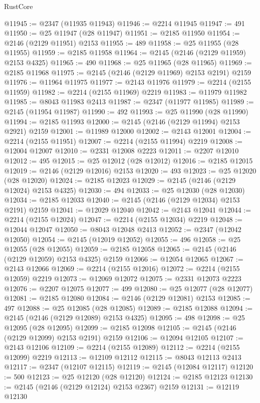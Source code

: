 \begin{lexlean}{RustCore}
\begin{coremodule}
@11945 := @2347 (@11935 @11943)
@11946 := @2214 @11945
@11947 := 491
@11950 := @25 @11947 (@28 @11947)
@11951 := @2185 @11950
@11954 := @2146 (@2129 @11951) @2153
@11955 := 489
@11958 := @25 @11955 (@28 @11955)
@11959 := @2185 @11958
@11964 := @2145 (@2146 (@2129 @11959) @2153 @4325)
@11965 := 490
@11968 := @25 @11965 (@28 @11965)
@11969 := @2185 @11968
@11975 := @2145 (@2146 (@2129 @11969) @2153 @2191) @2159
@11976 := @11964 @11975
@11977 := @2143 @11976
@11979 := @2214 (@2155 @11959)
@11982 := @2214 (@2155 @11969) @2219
@11983 := @11979 @11982
@11985 := @8043 @11983 @2413
@11987 := @2347 (@11977 @11985)
@11989 := @2145 (@11954 @11987)
@11990 := 492
@11993 := @25 @11990 (@28 @11990)
@11994 := @2185 @11993
@12000 := @2145 (@2146 (@2129 @11994) @2153 @2921) @2159
@12001 := @11989 @12000
@12002 := @2143 @12001
@12004 := @2214 (@2155 @11951)
@12007 := @2214 (@2155 @11994) @2219
@12008 := @12004 @12007
@12010 := @2331 @12008 @2223
@12011 := @2207 @12010
@12012 := 495
@12015 := @25 @12012 (@28 @12012)
@12016 := @2185 @12015
@12019 := @2146 (@2129 @12016) @2153
@12020 := 493
@12023 := @25 @12020 (@28 @12020)
@12024 := @2185 @12023
@12029 := @2145 (@2146 (@2129 @12024) @2153 @4325)
@12030 := 494
@12033 := @25 @12030 (@28 @12030)
@12034 := @2185 @12033
@12040 := @2145 (@2146 (@2129 @12034) @2153 @2191) @2159
@12041 := @12029 @12040
@12042 := @2143 @12041
@12044 := @2214 (@2155 @12024)
@12047 := @2214 (@2155 @12034) @2219
@12048 := @12044 @12047
@12050 := @8043 @12048 @2413
@12052 := @2347 (@12042 @12050)
@12054 := @2145 (@12019 @12052)
@12055 := 496
@12058 := @25 @12055 (@28 @12055)
@12059 := @2185 @12058
@12065 := @2145 (@2146 (@2129 @12059) @2153 @4325) @2159
@12066 := @12054 @12065
@12067 := @2143 @12066
@12069 := @2214 (@2155 @12016)
@12072 := @2214 (@2155 @12059) @2219
@12073 := @12069 @12072
@12075 := @2331 @12073 @2223
@12076 := @2207 @12075
@12077 := 499
@12080 := @25 @12077 (@28 @12077)
@12081 := @2185 @12080
@12084 := @2146 (@2129 @12081) @2153
@12085 := 497
@12088 := @25 @12085 (@28 @12085)
@12089 := @2185 @12088
@12094 := @2145 (@2146 (@2129 @12089) @2153 @4325)
@12095 := 498
@12098 := @25 @12095 (@28 @12095)
@12099 := @2185 @12098
@12105 := @2145 (@2146 (@2129 @12099) @2153 @2191) @2159
@12106 := @12094 @12105
@12107 := @2143 @12106
@12109 := @2214 (@2155 @12089)
@12112 := @2214 (@2155 @12099) @2219
@12113 := @12109 @12112
@12115 := @8043 @12113 @2413
@12117 := @2347 (@12107 @12115)
@12119 := @2145 (@12084 @12117)
@12120 := 500
@12123 := @25 @12120 (@28 @12120)
@12124 := @2185 @12123
@12130 := @2145 (@2146 (@2129 @12124) @2153 @2367) @2159
@12131 := @12119 @12130

\end{coremodule}
\end{lexlean}
